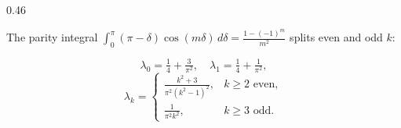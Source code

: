 \documentclass[aspectratio=169,9pt]{beamer}
\begin{document}
\begin{frame}[noframenumbering]
\begin{columns}[T,onlytextwidth]
\begin{column}{0.46\textwidth}
\begin{bluecard}[height=46mm]
{				}
				\vspace{-2.5mm}\par
				{\scriptsize The parity integral $\int_0^\pi(\pi-\delta)\cos(m\delta)\,d\delta=\tfrac{1-(-1)^m}{m^2}$ splits even and odd $k$:}\par\vspace{0.5mm}
				{\scriptsize
					\[
						\lambda_0=\tfrac14+\tfrac{3}{\pi^2},\quad
						\lambda_1=\tfrac14+\tfrac{1}{\pi^2},
					\]
					\[
						\lambda_k=\begin{cases}\tfrac{k^2+3}{\pi^2(k^2-1)^2}, & k\ge2\text{ even},\\[1mm]\tfrac{1}{\pi^2 k^2}, & k\ge3\text{ odd}.\end{cases}
					\]
				}
			\end{bluecard}
		\end{column}
	\end{columns}
\end{frame}
\end{document}
